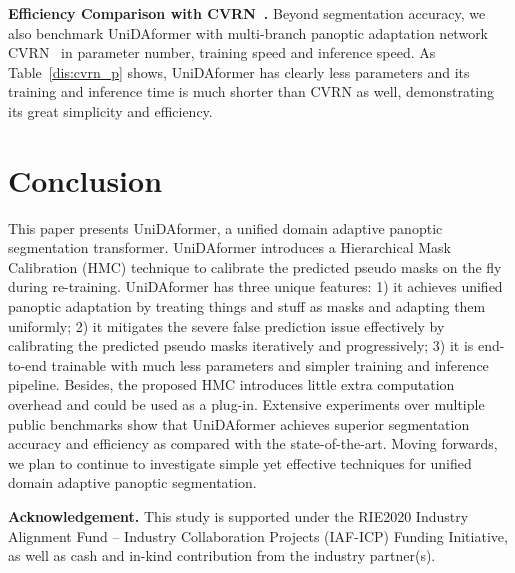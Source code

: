 \documentclass[10pt,twocolumn,letterpaper]{article}
\begin{document}
\noindent \textbf{Efficiency Comparison with CVRN~\cite{huang2021cvrn}.} Beyond segmentation accuracy, we also benchmark UniDAformer with multi-branch panoptic adaptation network CVRN~\cite{huang2021cvrn} in parameter number, training speed and inference speed. As Table~\ref{dis:cvrn_p} shows, UniDAformer has clearly less parameters and its training and inference time is much shorter than CVRN as well, demonstrating its great simplicity and efficiency.

\section{Conclusion}
This paper presents UniDAformer, a unified domain adaptive panoptic segmentation transformer.
UniDAformer introduces a Hierarchical Mask Calibration (HMC) technique to 
calibrate the predicted pseudo masks on the fly during re-training.
UniDAformer has three unique features: 1) it achieves unified panoptic
adaptation by treating things and stuff as masks and adapting them uniformly; 2) it mitigates the severe false prediction issue effectively by calibrating the predicted pseudo masks iteratively and progressively; 3) it is end-to-end trainable with much less parameters and simpler training and inference pipeline. Besides, the proposed HMC introduces little extra computation overhead and could be used as a plug-in.
Extensive experiments over multiple public benchmarks show that UniDAformer achieves superior segmentation accuracy and efficiency as compared with the state-of-the-art.
Moving forwards, we plan to continue to investigate simple yet effective techniques for unified domain adaptive panoptic segmentation.

\textbf{Acknowledgement.}
This study is supported under the RIE2020 Industry Alignment Fund – Industry Collaboration Projects (IAF-ICP) Funding Initiative, as well as cash and in-kind contribution from the industry partner(s).


{\small


}
\end{document}
